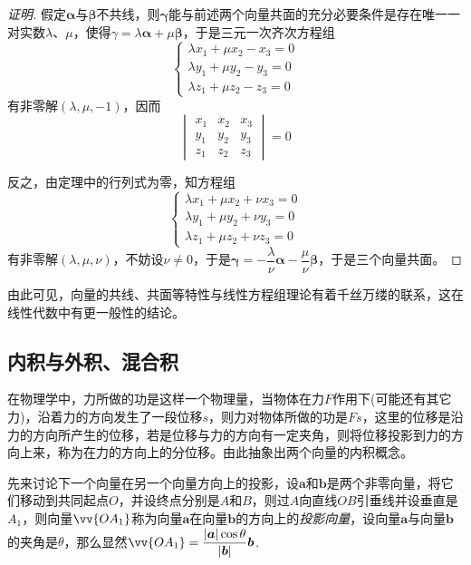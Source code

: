 \begin{proof}[证明]
假定$\bm{\alpha}$与$\bm{\beta}$不共线，则$\bm{\gamma}$能与前述两个向量共面的充分必要条件是存在唯一一对实数$\lambda$、$\mu$，使得$\gamma=\lambda \bm{\alpha} + \mu \bm{\beta}$，于是三元一次齐次方程组
\[
  \left\{
    \begin{array}{lll}
      \lambda x_1 + \mu x_2 - x_3 = 0  \\
      \lambda y_1 + \mu y_2 - y_3 = 0 \\
      \lambda z_1 + \mu z_2 - z_3 = 0
    \end{array}
    \right.
\]
有非零解$(\lambda, \mu, -1)$，因而
\[
  \begin{vmatrix}
    x_1 & x_2 & x_3\\
    y_1 & y_2 & y_3 \\
    z_1 & z_2 & z_3 
  \end{vmatrix}
  = 0
\]

反之，由定理中的行列式为零，知方程组
\[
  \left\{
    \begin{array}{lll}
      \lambda x_1 + \mu x_2 + \nu x_3 = 0  \\
      \lambda y_1 + \mu y_2 + \nu y_3 = 0 \\
      \lambda z_1 + \mu z_2 + \nu z_3 = 0
    \end{array}
    \right.
\]
有非零解$(\lambda, \mu, \nu)$，不妨设$\nu \neq 0$，于是$\bm{\gamma} = -\dfrac{\lambda}{\nu} \bm{\alpha} - \dfrac{\mu}{\nu} \bm{\beta}$，于是三个向量共面。
\end{proof}

由此可见，向量的共线、共面等特性与线性方程组理论有着千丝万缕的联系，这在线性代数中有更一般性的结论。

\subsection{内积与外积、混合积}
\label{sec:product-of-vector}

在物理学中，力所做的功是这样一个物理量，当物体在力$F$作用下(可能还有其它力)，沿着力的方向发生了一段位移$s$，则力对物体所做的功是$Fs$，这里的位移是沿力的方向所产生的位移，若是位移与力的方向有一定夹角，则将位移投影到力的方向上来，称为在力的方向上的分位移。由此抽象出两个向量的内积概念。

先来讨论下一个向量在另一个向量方向上的投影，设$\bm{a}$和$\bm{b}$是两个非零向量，将它们移动到共同起点$O$，并设终点分别是$A$和$B$，则过$A$向直线$OB$引垂线并设垂直是$A_1$，则向量$\vv{OA_1}$称为向量$\bm{a}$在向量$\bm{b}$的方向上的\emph{投影向量}，设向量$\bm{a}$与向量$\bm{b}$的夹角是$\theta$，那么显然$\vv{OA_1}=\dfrac{|\bm{a}|\cos{\theta}}{|\bm{b}|}\bm{b}$.

